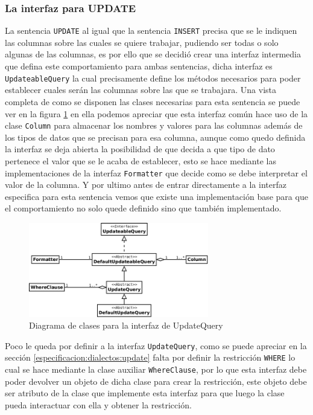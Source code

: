 \subsubsection{La interfaz para UPDATE}
La sentencia \verb=UPDATE= al igual que la sentencia \verb=INSERT= precisa que se le indiquen las columnas sobre las cuales se quiere trabajar, pudiendo ser todas o solo algunas de las columnas, es por ello que se decidió crear una interfaz intermedia que defina este comportamiento para ambas sentencias, dicha interfaz es \verb=UpdateableQuery= la cual precisamente define los métodos necesarios para poder establecer cuales serán las columnas sobre las que se trabajara. Una vista completa de como se disponen las clases necesarias para esta sentencia se puede ver en la figura \ref{fig:dc-updatequery} en ella podemos apreciar que esta interfaz común hace uso de la clase \verb=Column= para almacenar los nombres y valores para las columnas además de los tipos de datos que se precisan para esa columna, aunque como quedo definida la interfaz se deja abierta la posibilidad de que \jj decida a que tipo de dato pertenece el valor que se le acaba de establecer, esto se hace mediante las implementaciones de la interfaz \verb=Formatter= que decide como se debe interpretar el valor de la columna. Y por ultimo antes de entrar directamente a la interfaz especifica para esta sentencia vemos que existe una implementación base para que el comportamiento no solo quede definido sino que también implementado. 

\begin{figure}
  \centering
    \includegraphics[width=0.7\textwidth]{figuras/jdbgm-dc-update.png}
  \caption{Diagrama de clases para la interfaz de UpdateQuery}
  \label{fig:dc-updatequery}
\end{figure}

Poco le queda por definir a la interfaz \verb=UpdateQuery=, como se puede apreciar en la sección \ref{especificacion:dialectos:update} falta por definir la restricción \verb=WHERE= lo cual se hace mediante la clase auxiliar \verb=WhereClause=, por lo que esta interfaz debe poder devolver un objeto de dicha clase para crear la restricción, este objeto debe ser atributo de la clase que implemente esta interfaz para que luego la clase pueda interactuar con ella y obtener la restricción. 

